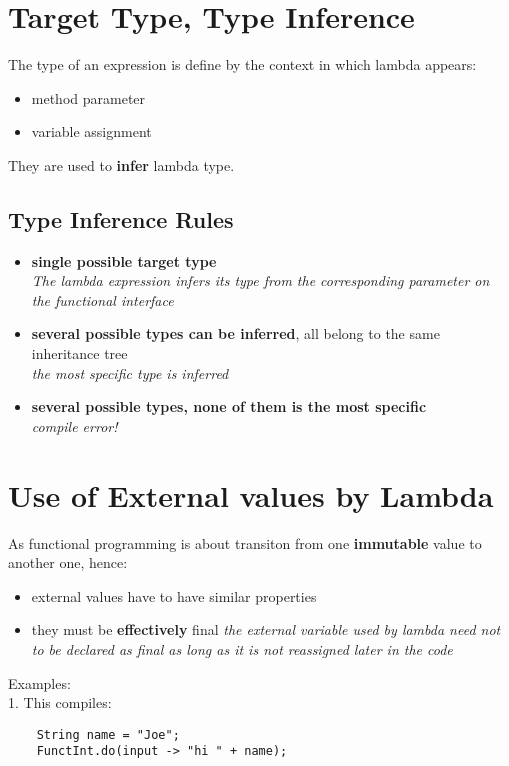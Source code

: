 \documentclass{report}
\begin{document}
\section{Target Type, Type Inference}

The type of an expression is define by the context in which lambda appears:
\begin{itemize}
	\item method parameter
	\item variable assignment
\end{itemize}
They are used to \textbf{infer} lambda type.

\subsection*{Type Inference Rules}
\begin{itemize}
	\item \textbf{single possible target type}\\
\textit{	The lambda expression infers its type from the corresponding parameter on the functional interface}
	\item \textbf{several possible types can be inferred}, all belong to the same inheritance tree\\
\textit{	the most specific type is inferred}
\item \textbf{several possible types, none of them is the most specific}\\
\textit{compile error!}
	
\end{itemize}

\section{Use of External values by Lambda}

As functional programming is about transiton from one \textbf{immutable} value to another one, hence:
\begin{itemize}
	\item external values have to have similar properties
	\item they must be \textbf{effectively} final
	\textit{the external variable used by lambda need not to be declared as final as long as it is not \textit{reassigned} later in the code }
	
\end{itemize}
Examples:\\
1. This compiles:
\begin{verbatim}
	String name = "Joe";
	FunctInt.do(input -> "hi " + name);
\end{verbatim}
\end{document}
